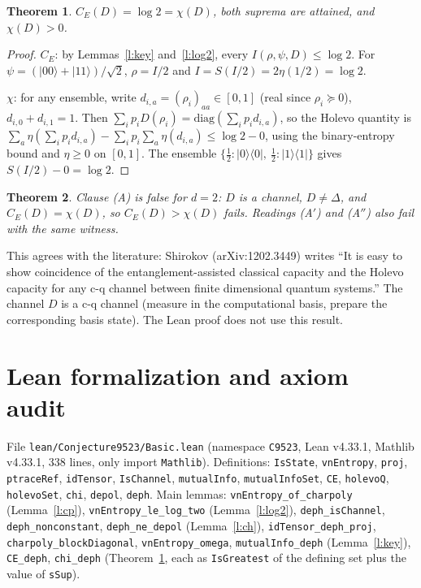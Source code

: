 \documentclass[11pt]{article}
\newtheorem{theorem}{Theorem}
\theoremstyle{definition}
\newcommand{\nml}{\eta}
\begin{document}
\begin{theorem}\label{t:main}
$C_E(D)=\log 2=\chi(D)$, both suprema are attained, and $\chi(D)>0$.
\end{theorem}
\begin{proof}
$C_E$: by Lemmas~\ref{l:key} and~\ref{l:log2}, every $I(\rho,\psi,D)\le\log 2$. For
$\psi=(|00\rangle+|11\rangle)/\sqrt2$, $\rho=I/2$ and $I=S(I/2)=2\nml(1/2)=\log 2$.

$\chi$: for any ensemble, write $d_{i,a}=(\rho_i)_{aa}\in[0,1]$ (real since $\rho_i\succeq0$),
$d_{i,0}+d_{i,1}=1$. Then $\sum_ip_iD(\rho_i)=\mathrm{diag}(\sum_ip_id_{i,a})$, so the Holevo
quantity is $\sum_a\nml(\sum_ip_id_{i,a})-\sum_ip_i\sum_a\nml(d_{i,a})\le\log2-0$, using the
binary-entropy bound and $\nml\ge0$ on $[0,1]$. The ensemble
$\{\tfrac12:|0\rangle\langle0|,\ \tfrac12:|1\rangle\langle1|\}$ gives $S(I/2)-0=\log 2$.
\end{proof}

\begin{theorem}
Clause (A) is false for $d=2$: $D$ is a channel, $D\ne\Delta$, and $C_E(D)=\chi(D)$, so
$C_E(D)>\chi(D)$ fails. Readings (A$'$) and (A$''$) also fail with the same witness.
\end{theorem}

This agrees with the literature: Shirokov (arXiv:1202.3449) writes ``It is easy to show coincidence
of the entanglement-assisted classical capacity and the Holevo capacity for any c-q channel between
finite dimensional quantum systems.'' The channel $D$ is a c-q channel (measure in the computational
basis, prepare the corresponding basis state). The Lean proof does not use this result.

\section{Lean formalization and axiom audit}

File \texttt{lean/Conjecture9523/Basic.lean} (namespace \texttt{C9523}, Lean v4.33.1, Mathlib
v4.33.1, 338 lines, only import \texttt{Mathlib}). Definitions: \texttt{IsState},
\texttt{vnEntropy}, \texttt{proj}, \texttt{ptraceRef}, \texttt{idTensor}, \texttt{IsChannel},
\texttt{mutualInfo}, \texttt{mutualInfoSet}, \texttt{CE}, \texttt{holevoQ}, \texttt{holevoSet},
\texttt{chi}, \texttt{depol}, \texttt{deph}. Main lemmas: \texttt{vnEntropy\_of\_charpoly}
(Lemma~\ref{l:cp}), \texttt{vnEntropy\_le\_log\_two} (Lemma~\ref{l:log2}),
\texttt{deph\_isChannel}, \texttt{deph\_nonconstant}, \texttt{deph\_ne\_depol}
(Lemma~\ref{l:ch}), \texttt{idTensor\_deph\_proj}, \texttt{charpoly\_blockDiagonal},
\texttt{vnEntropy\_omega}, \texttt{mutualInfo\_deph} (Lemma~\ref{l:key}), \texttt{CE\_deph},
\texttt{chi\_deph} (Theorem~\ref{t:main}, each as \texttt{IsGreatest} of the defining set plus the
value of \texttt{sSup}).
\end{document}
